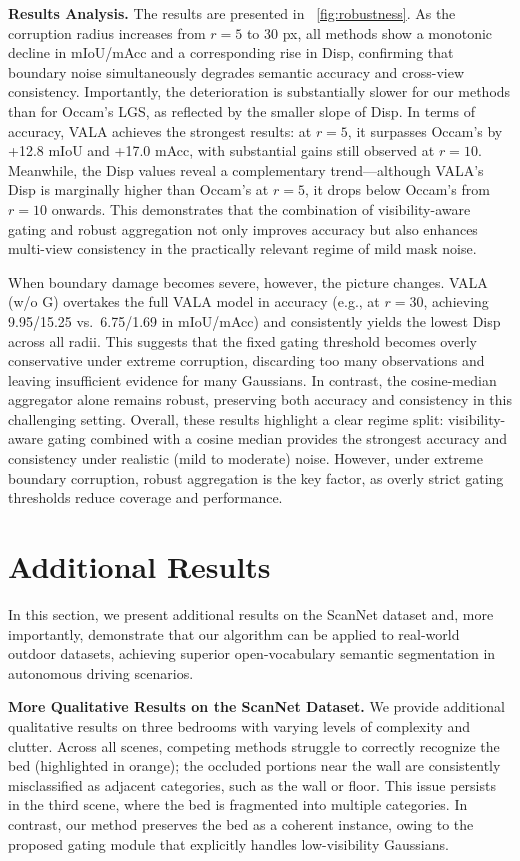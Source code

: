 \textbf{Results Analysis.}
The results are presented in \figureautorefname~\ref{fig:robustness}. As the corruption radius increases from $r=5$ to $30$ px, all methods show a monotonic decline in mIoU/mAcc and a corresponding rise in Disp, confirming that boundary noise simultaneously degrades semantic accuracy and cross-view consistency. Importantly, the deterioration is substantially slower for our methods than for Occam’s LGS, as reflected by the smaller slope of Disp. In terms of accuracy, VALA achieves the strongest results: at $r=5$, it surpasses Occam’s by +12.8 mIoU and +17.0 mAcc, with substantial gains still observed at $r=10$. Meanwhile, the Disp values reveal a complementary trend—although VALA’s Disp is marginally higher than Occam’s at $r=5$, it drops below Occam’s from $r=10$ onwards. This demonstrates that the combination of visibility-aware gating and robust aggregation not only improves accuracy but also enhances multi-view consistency in the practically relevant regime of mild mask noise.

When boundary damage becomes severe, however, the picture changes. VALA (w/o G) overtakes the full VALA model in accuracy (e.g., at $r=30$, achieving 9.95/15.25 vs.\ 6.75/1.69 in mIoU/mAcc) and consistently yields the lowest Disp across all radii. This suggests that the fixed gating threshold becomes overly conservative under extreme corruption, discarding too many observations and leaving insufficient evidence for many Gaussians. In contrast, the cosine-median aggregator alone remains robust, preserving both accuracy and consistency in this challenging setting. Overall, these results highlight a clear regime split: visibility-aware gating combined with a cosine median provides the strongest accuracy and consistency under realistic (mild to moderate) noise. However, under extreme boundary corruption, robust aggregation is the key factor, as overly strict gating thresholds reduce coverage and performance.

\section{Additional Results}
\label{subsec:add_results}
In this section, we present additional results on the ScanNet dataset and, more importantly, demonstrate that our algorithm can be applied to real-world outdoor datasets, achieving superior open-vocabulary semantic segmentation in autonomous driving scenarios.

\textbf{More Qualitative Results on the ScanNet Dataset.}
We provide additional qualitative results on three bedrooms with varying levels of complexity and clutter. Across all scenes, competing methods struggle to correctly recognize the bed (highlighted in orange); the occluded portions near the wall are consistently misclassified as adjacent categories, such as the wall or floor. This issue persists in the third scene, where the bed is fragmented into multiple categories. In contrast, our method preserves the bed as a coherent instance, owing to the proposed gating module that explicitly handles low-visibility Gaussians.

